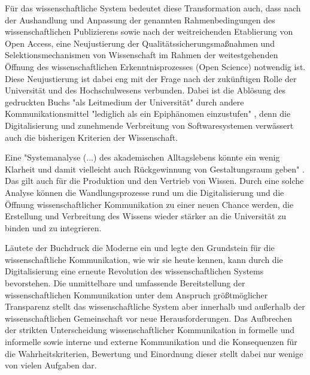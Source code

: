 Für das wissenschaftliche System bedeutet diese Transformation auch, dass nach der Aushandlung und Anpassung der genannten Rahmenbedingungen des wissenschaftlichen Publizierens sowie nach der weitreichenden Etablierung von Open Access, eine Neujustierung der Qualitätssicherungsmaßnahmen und Selektionsmechanismen von Wissenschaft im Rahmen der weitestgehenden Öffnung des wissenschaftlichen Erkenntnisprozesses (Open Science) notwendig ist. Diese Neujustierung ist dabei eng mit der Frage nach der zukünftigen Rolle der Universität und des Hochschulwesens verbunden. Dabei ist die Ablösung des gedruckten Buchs "als Leitmedium der Universität" durch andere Kommunikationsmittel "lediglich als ein Epiphänomen einzustufen" \cite{Warnke_2012}, denn die Digitalisierung und zunehmende Verbreitung von Softwaresystemen verwässert auch die bisherigen Kriterien der Wissenschaft.

Eine "Systemanalyse (...) des akademischen Alltagslebens könnte ein wenig Klarheit und damit vielleicht auch Rückgewinnung von Gestaltungsraum geben" \cite{Warnke_2012}. Das gilt auch für die Produktion und den Vertrieb von Wissen. Durch eine solche Analyse können die Wandlungsprozesse rund um die Digitalisierung und die Öffnung wissenschaftlicher Kommunikation zu einer neuen Chance werden, die Erstellung und Verbreitung des Wissens wieder stärker an die Universität zu binden und zu integrieren.

Läutete der Buchdruck die Moderne ein und legte den Grundstein für die wissenschaftliche Kommunikation, wie wir sie heute kennen, kann durch die Digitalisierung eine erneute Revolution des wissenschaftlichen Systems bevorstehen. Die unmittelbare und umfassende Bereitstellung der wissenschaftlichen Kommunikation unter dem Anspruch größtmöglicher Transparenz stellt das wissenschaftliche System aber innerhalb und außerhalb der wissenschaftlichen Gemeinschaft vor neue Herausforderungen. Das Aufbrechen der strikten Unterscheidung wissenschaftlicher Kommunikation in formelle und informelle sowie interne und externe Kommunikation und die Konsequenzen für die Wahrheitskriterien, Bewertung und Einordnung dieser stellt dabei nur wenige von vielen Aufgaben dar.

